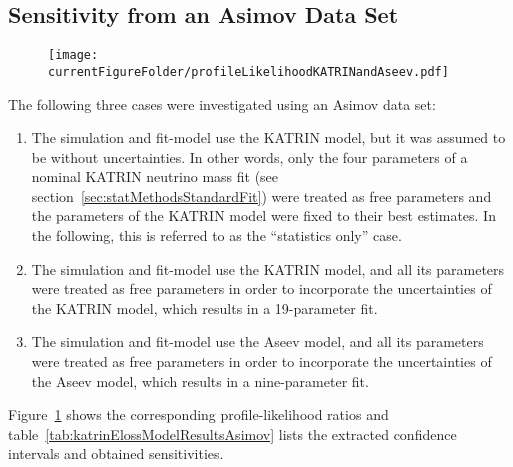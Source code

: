 \subsection{Sensitivity from an Asimov Data Set}
\label{sec:katrinElossModelResultsAsimov}
\begin{figure}[t]
	\centering
	\texttt{[image: \\currentFigureFolder/profileLikelihoodKATRINandAseev.pdf]}
	\label{fig:katrinElossResultsProfileLikelihood}
\end{figure}
The following three cases were investigated using an Asimov data set:
\begin{enumerate}
	\item The simulation and fit-model use the KATRIN model, but it was assumed to be without uncertainties. In other words, only the four parameters of a nominal KATRIN neutrino mass fit (see section~\ref{sec:statMethodsStandardFit}) were treated as free parameters and the parameters of the KATRIN model were fixed to their best estimates. In the following, this is referred to as the ``statistics only'' case.
	\item The simulation and fit-model use the KATRIN model, and all its parameters were treated as free parameters  in order to incorporate the uncertainties of the KATRIN model, which results in a 19-parameter fit.
	\item The simulation and fit-model use the Aseev model, and all its parameters were treated as free parameters in order to incorporate the uncertainties of the Aseev model, which results in a nine-parameter fit.
\end{enumerate}
Figure~\ref{fig:katrinElossResultsProfileLikelihood} shows the corresponding profile-likelihood ratios and table~\ref{tab:katrinElossModelResultsAsimov} lists the extracted confidence intervals and obtained sensitivities.

